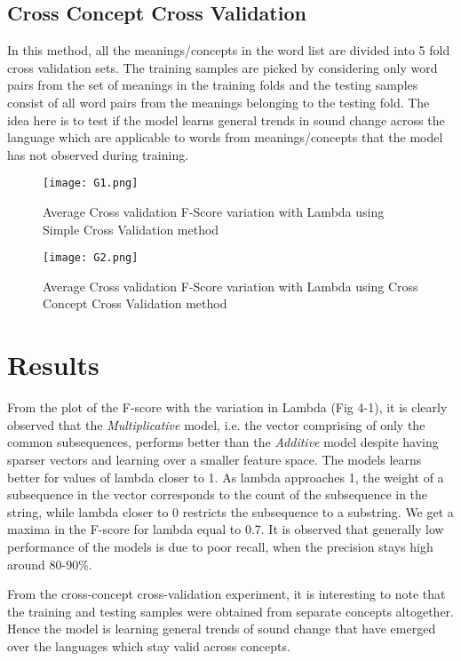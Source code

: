 \subsection{Cross Concept Cross Validation}
In this method, all the meanings/concepts in the word list are divided into 5 fold cross validation sets. The training samples are picked by considering only word pairs from the set of meanings in the training folds and the testing samples consist of all word pairs from the meanings belonging to the testing fold. The idea here is to test if the model learns general trends in sound change across the language which are applicable to words from meanings/concepts that the model has not observed during training.

\begin{figure}[h]
\centering
\texttt{[image: G1.png]}
\caption{Average Cross validation F-Score variation with Lambda using Simple Cross Validation method}
\end{figure}

\begin{figure}[h]
\centering
\texttt{[image: G2.png]}
\caption{Average Cross validation F-Score variation with Lambda using Cross Concept Cross Validation method}
\end{figure}

\section{Results}

From the plot of the F-score with the variation in Lambda (Fig 4-1), it is clearly observed that the \textit{Multiplicative} model, i.e. the vector comprising of only the common subsequences, performs better than the \textit{Additive} model despite having sparser vectors and learning over a smaller feature space. The models learns better for values of lambda closer to 1. As lambda approaches 1, the weight of a subsequence in the vector corresponds to the count of the subsequence in the string, while lambda closer to 0 restricts the subsequence to a substring. We get a maxima in the F-score for lambda equal to 0.7. It is observed that generally low performance of the models is due to poor recall, when the precision stays high around 80-90\%.

From the cross-concept cross-validation experiment, it is interesting to note that the training and testing samples were obtained from separate concepts altogether. Hence the model is learning general trends of sound change that have emerged over the languages which stay valid across concepts. 

